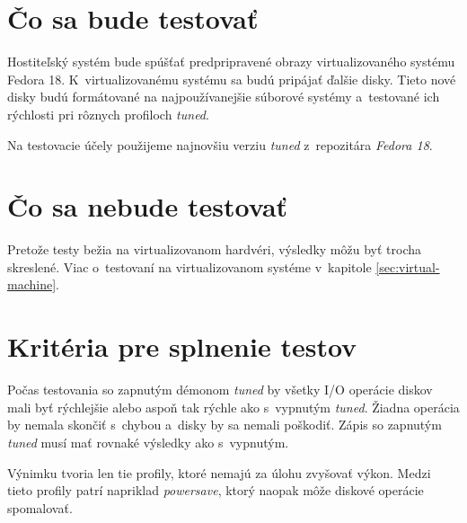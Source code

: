 \section{Čo sa bude testovať}

Hostiteľský systém bude spúšťať predpripravené obrazy virtualizovaného systému
Fedora 18. K~virtualizovanému systému sa budú pripájať ďalšie disky. Tieto nové
disky budú formátované na najpoužívanejšie súborové systémy a~testované ich
rýchlosti pri rôznych profiloch \emph{tuned}.

Na testovacie účely použijeme najnovšiu verziu \emph{tuned} z~repozitára
\emph{Fedora 18}.

\section{Čo sa nebude testovať}

Pretože testy bežia na virtualizovanom hardvéri, výsledky môžu byť trocha
skreslené. Viac o~testovaní na virtualizovanom systéme v~kapitole
\ref{sec:virtual-machine}.


\section{Kritéria pre splnenie testov}

Počas testovania so zapnutým démonom \emph{tuned} by všetky I/O operácie diskov
mali byť rýchlejšie alebo aspoň tak rýchle ako s~vypnutým \emph{tuned}. Žiadna
operácia by nemala skončiť s~chybou a~disky by sa nemali poškodiť. Zápis so
zapnutým \emph{tuned} musí mať rovnaké výsledky ako s~vypnutým.

Výnimku tvoria len tie profily, ktoré nemajú za úlohu zvyšovať výkon. Medzi
tieto profily patrí napriklad \emph{powersave}, ktorý naopak môže diskové
operácie spomalovať.

